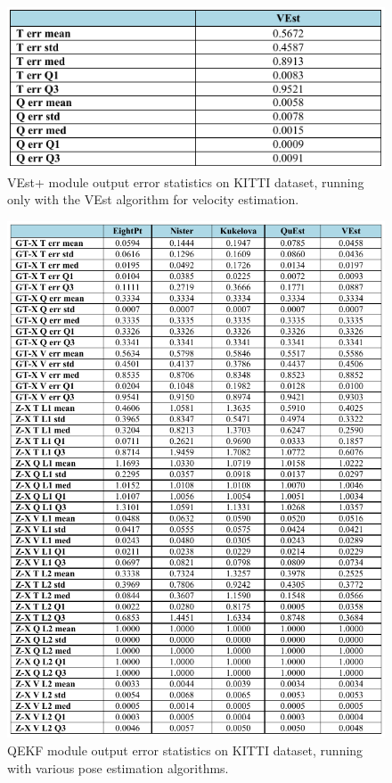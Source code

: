 \documentclass[11pt]{article}
\begin{document}
\begin{itemize}
    \begin{figure}[H]
      \begin{center}
        \includegraphics[width=\linewidth]{fig02_VEstP.png}
      \end{center}
      \caption{VEst+ module output error statistics on KITTI dataset, running only with the VEst algorithm for velocity estimation.}
    \end{figure}


    \begin{figure}[H]
      \begin{center}
        \includegraphics[width=\linewidth]{fig03_QEKF.png}
      \end{center}
      \caption{QEKF module output error statistics on KITTI dataset, running with various pose estimation algorithms.}
    \end{figure}


\end{itemize}
\end{document}
